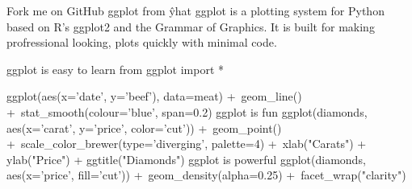 Fork me on GitHub
ggplot from ŷhat
ggplot is a plotting system for Python based on R's ggplot2 and the Grammar of Graphics. It is built for making profressional looking, plots quickly with minimal code.

ggplot is easy to learn
from ggplot import *

ggplot(aes(x='date', y='beef'), data=meat) +\
    geom_line() +\
    stat_smooth(colour='blue', span=0.2)
ggplot is fun
ggplot(diamonds, aes(x='carat', y='price', color='cut')) +\
    geom_point() +\
    scale_color_brewer(type='diverging', palette=4) +\
    xlab("Carats") + ylab("Price") + ggtitle("Diamonds")
ggplot is powerful
ggplot(diamonds, aes(x='price', fill='cut')) +\
    geom_density(alpha=0.25) +\
    facet_wrap("clarity")


